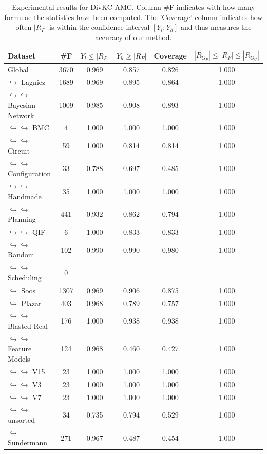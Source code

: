 \documentclass{article}
\newcommand\divkcamc[0]{DivKC-AMC\xspace}
\begin{document}
    
\begin{table}[h!]
        \centering
            \begin{tabular}{l|c|c|c|c|c}
                Dataset & \#F & $Y_l \leq |R_F|$ & $Y_h \geq |R_F|$ & Coverage & $|R_{G_P}| \leq |R_F| \leq |R_{G_U}|$ \\
                \hline
Global & 3670 & 0.969 & 0.857 & 0.826 & 1.000 \\
$\hookrightarrow$ Lagniez \cite{D4} & 1689 & 0.969 & 0.895 & 0.864 & 1.000 \\
$\hookrightarrow \hookrightarrow$ Bayesian Network & 1009 & 0.985 & 0.908 & 0.893 & 1.000 \\
$\hookrightarrow \hookrightarrow$ BMC & 4 & 1.000 & 1.000 & 1.000 & 1.000 \\
$\hookrightarrow \hookrightarrow$ Circuit & 59 & 1.000 & 0.814 & 0.814 & 1.000 \\
$\hookrightarrow \hookrightarrow$ Configuration & 33 & 0.788 & 0.697 & 0.485 & 1.000 \\
$\hookrightarrow \hookrightarrow$ Handmade & 35 & 1.000 & 1.000 & 1.000 & 1.000 \\
$\hookrightarrow \hookrightarrow$ Planning & 441 & 0.932 & 0.862 & 0.794 & 1.000 \\
$\hookrightarrow \hookrightarrow$ QIF & 6 & 1.000 & 0.833 & 0.833 & 1.000 \\
$\hookrightarrow \hookrightarrow$ Random & 102 & 0.990 & 0.990 & 0.980 & 1.000 \\
$\hookrightarrow \hookrightarrow$ Scheduling & 0 & & & & \\
$\hookrightarrow$ Soos \cite{soos_2024_10449477} & 1307 & 0.969 & 0.906 & 0.875 & 1.000 \\
$\hookrightarrow$ Plazar \cite{Plazar2019} & 403 & 0.968 & 0.789 & 0.757 & 1.000 \\
$\hookrightarrow \hookrightarrow$ Blasted Real & 176 & 1.000 & 0.938 & 0.938 & 1.000 \\
$\hookrightarrow \hookrightarrow$ Feature Models & 124 & 0.968 & 0.460 & 0.427 & 1.000 \\
$\hookrightarrow \hookrightarrow$ V15 & 23 & 1.000 & 1.000 & 1.000 & 1.000 \\
$\hookrightarrow \hookrightarrow$ V3 & 23 & 1.000 & 1.000 & 1.000 & 1.000 \\
$\hookrightarrow \hookrightarrow$ V7 & 23 & 1.000 & 1.000 & 1.000 & 1.000 \\
$\hookrightarrow \hookrightarrow$ unsorted & 34 & 0.735 & 0.794 & 0.529 & 1.000 \\
$\hookrightarrow$ Sundermann \cite{SBK+:SPLC24} & 271 & 0.967 & 0.487 & 0.454 & 1.000 \\
        \end{tabular}
        \caption{Experimental results for \divkcamc.
            Column \#F indicates with how many formulae the statistics have been computed.
            The 'Coverage' column indicates how often $|R_F|$ is within the confidence interval $[Y_l; Y_h]$ and thus measures the accuracy of our method.
        }
        \label{divkc:tab:appmc}
    \end{table}
\end{document}
